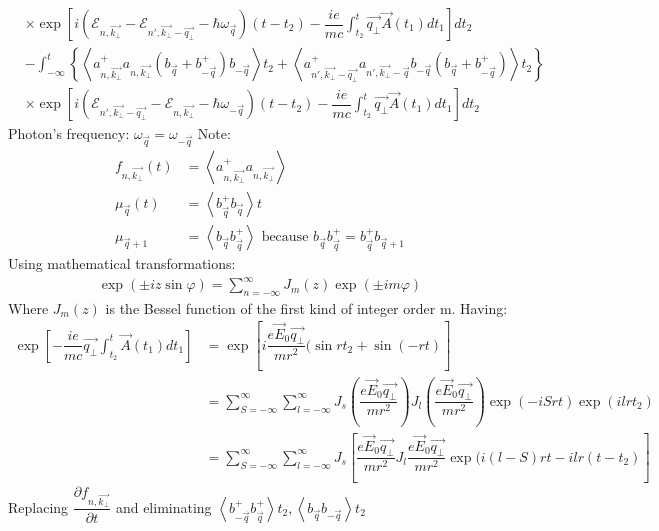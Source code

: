 \documentclass{article}
\begin{document}
\begin{align*}
    & \times \exp \left[i \left(\mathcal{E}_{n,\vec{k_\bot}}- \mathcal{E}_{n',\vec{k_\bot}-\vec{q_\bot}}- \hbar\omega_{\vec{q}} \right) (t-t_2) -\dfrac{ie}{mc}\int^t_{t_2} \vec{q_\bot} \vec{A}(t_1) dt_1 \right] dt_2 \\
    & - \int^t_{-\infty} \left\{\left\langle a^+_{n,\vec{k_\bot}} a_{n,\vec{k_\bot}} \left(b_{\vec{q}} + b^+_{-\vec{q}} \right)b_{-\vec{q}} \right\rangle t_2 + \left\langle a^+_{n',\vec{k_\bot}-\vec{q_\bot}}a_{n',\vec{k_\bot}-\vec{q}} b_{-\vec{q}}\left(b_{\vec{q}}+b^+_{-\vec{q}} \right) \right\rangle t_2 \right\} \\
    & \times \exp \left[i \left(\mathcal{E}_{n',\vec{k_\bot}-\vec{q_\bot}}-\mathcal{E}_{n,\vec{k_\bot}}-\hbar\omega_{-\vec{q}} \right)(t-t_2) - \dfrac{ie}{mc} \int^{t}_{t_2} \vec{q_\bot}\vec{A}(t_1)dt_1\right] dt_2
\end{align*}
Photon's frequency: $\omega_{\vec{q}}=\omega_{-\vec{q}}$
Note: 
\begin{align*}
    f_{n,\vec{k_\bot}}(t) & = \left\langle a^+_{n,\vec{k_\bot}} a_{n,\vec{k_\bot}} \right\rangle \\
    \mu_{\vec{q}}(t) &= \left\langle b^+_{\vec{q}}b_{\vec{q}} \right\rangle t \\
    \mu_{\vec{q}+1} & = \left\langle b_{\vec{q}} b^+_{\vec{q}} \right\rangle \text{ because } b_{\vec{q}} b^+_{\vec{q}} = b^+_{\vec{q}}b_{\vec{q}+1}
\end{align*}
Using mathematical transformations: 
\begin{align*}
    \exp (\pm i z \sin{\varphi}) = \sum^{\infty}_{n=-\infty} J_m(z) \exp(\pm i m \varphi)
\end{align*}
Where $J_m(z)$ is the Bessel function of the first kind of integer order m. Having: 
\begin{align*}
    \exp\left[ -\dfrac{ie}{mc}\vec{q_{\bot}}\int^t_{t_2}\vec{A}(t_1)dt_1 \right] & = \exp\left[ i \dfrac{e\vec{E}_0 \vec{q_\bot}}{m r^2}(\sin{rt_2}+\sin(-rt) \right] \\
    & = \sum^{\infty}_{S= -\infty} \sum^{\infty}_{l = -\infty} J_s \left(\dfrac{e\vec{E}_0 \vec{q_\bot}}{mr^2} \right)J_l \left(\dfrac{e\vec{E}_0\vec{q_\bot}}{mr^2} \right)\exp (-iSrt) \exp(ilrt_2)\\
    & = \sum^{\infty}_{S= -\infty} \sum^{\infty}_{l = -\infty} J_s \left[\dfrac{e\vec{E}_0 \vec{q_\bot}}{mr^2} J_l \dfrac{e\vec{E}_0\vec{q_\bot}}{mr^2} \exp(i(l-S) rt - ilr (t-t_2) \right]
\end{align*}
\newpage 
Replacing $\dfrac{\partial f_{n,\vec{k_\bot}}}{\partial t}$ and eliminating $\left\langle b^+_{-\vec{q}}b^+_{\vec{q}} \right\rangle t_2, \left\langle b_{\vec{q}} b_{-\vec{q}} \right\rangle t_2 $
\end{document}
